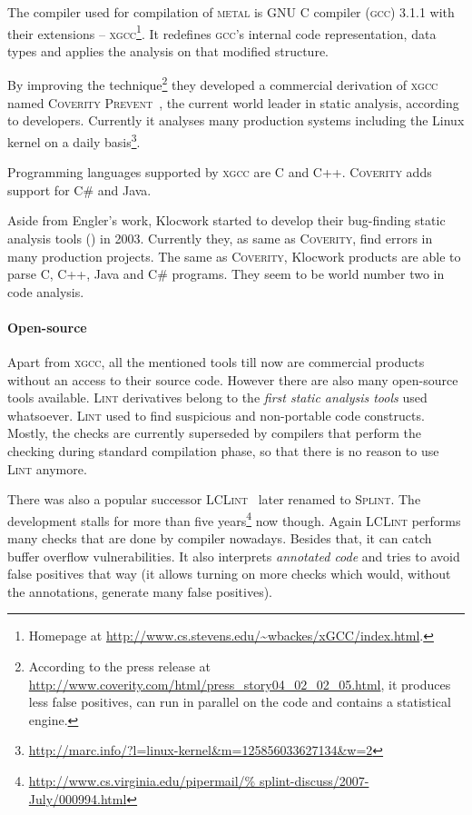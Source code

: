 \documentclass[11pt,a4paper]{article}
\begin{document}
The compiler used for compilation of \textsc{metal} is GNU C compiler
(\textsc{gcc}) 3.1.1 with their extensions -- \textsc{xgcc}\footnote{Homepage
at \url{http://www.cs.stevens.edu/~wbackes/xGCC/index.html}.}. It redefines
\textsc{gcc}'s internal code representation, data types and applies the
analysis on that modified structure.

By improving the technique\footnote{According to the press release at
\href{http://www.coverity.com/html/press_story04_02_02_05.html}%
{http://www.coverity.com/html/press\_story04\_02\_02\_05.html}, it produces
less false positives, can run in parallel on the code and contains a
statistical engine.} they developed a commercial derivation of \textsc{xgcc}
named \textsc{Coverity Prevent}~\cite{coverity}, the current world leader in
static analysis, according to developers. Currently it analyses many
production systems including the Linux kernel on a daily
basis\footnote{\url{http://marc.info/?l=linux-kernel&m=125856033627134&w=2}}.

Programming languages supported by \textsc{xgcc} are C and C++.
\textsc{Coverity} adds support for C\# and Java.

Aside from Engler's work, Klocwork started to develop their bug-finding static
analysis tools (\cite{klocwork}) in 2003. Currently they, as same as
\textsc{Coverity}, find errors in many production projects. The same as
\textsc{Coverity}, Klocwork products are able to parse C, C++, Java and C\#
programs. They seem to be world number two in code analysis.

\paragraph{Open-source}
Apart from \textsc{xgcc}, all the mentioned tools till now are commercial
products without an access to their source code. However there are also many
open-source tools available. \textsc{Lint} derivatives belong to the
\emph{first static analysis tools} used whatsoever. \textsc{Lint} used to find
suspicious and non-portable code constructs. Mostly, the checks are currently
superseded by compilers that perform the checking during standard compilation
phase, so that there is no reason to use \textsc{Lint} anymore.

There was also a popular successor \textsc{LCLint}~\cite{lclint} later renamed
to \textsc{Splint}. The development stalls for more than five
years\footnote{\url{http://www.cs.virginia.edu/pipermail/%
splint-discuss/2007-July/000994.html}} now though. Again \textsc{LCLint}
performs many checks that are done by compiler nowadays. Besides that, it can
catch buffer overflow vulnerabilities. It also interprets \emph{annotated
code} and tries to avoid false positives that way (it allows turning on more
checks which would, without the annotations, generate many false positives).
\end{document}
